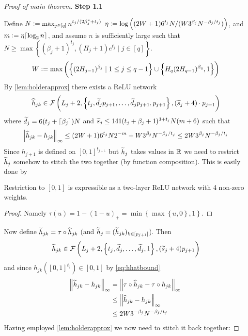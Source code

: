 \begin{proof}[Proof of main theorem]
  \textbf{Step 1.1}

  Define %
  $N \vcentcolon= \max_{j \in [q]} n^{t_j/(2 \beta^*_j + t_j)}$
  $\eta \vcentcolon= \log \left((2W + 1) 6^{t_j} N
  / (W 3^{\beta_j} N^{-\beta_j/t_j}) \right)$,
  and $m \vcentcolon= \eta \lceil\log_2 n\rceil$,
  and assume $n$ is sufficiently large such that
  $N \geq \max \left\{ (\beta_j + 1)^{t_j},
  (H_j+1)e^{t_j} \mid j \in [q] \right\}$.
  \begin{equation}
    W \vcentcolon= \max \left( \left\{ (2 H_{j-1})^{\beta_j} \mid 1\leq j\leq q-1 \right\}
    \cup \left\{ H_q(2H_{q-1})^{\beta_q}, 1\right\} \right)
  \end{equation}
  By \cref{lem:holderapprox} there exists a ReLU network
  \begin{equation}
    \widehat{h}_{jk} \in \mathcal{F} \left( L_j + 2, \left\{ t_j, \widetilde{d}_j p_{j+1}, \dots,
    \widetilde{d}_j p_{j+1}, p_{j+1} \right\}, (\widetilde{s}_j + 4) \cdot p_{j+1} \right)
  \end{equation}
  where $\widetilde{d}_j = 6(t_j + \lceil\beta_j\rceil)N$ and
  $\widetilde{s}_j \leq 141 (t_j + \beta_j + 1)^{3 + t_j} N (m + 6)$
  such that
  \begin{equation}
    \norm{\widehat{h}_{jk} - h_{jk}}_\infty \leq (2 W + 1) 6^{t_j} N 2^{-m}
    + W 3^{\beta_j} N^{-\beta_j/t_j} \leq 2 W 3^{\beta_j} N^{-\beta_j/t_j}
    \label{eq:hhatbound}
  \end{equation} 
  Since $h_{j+1}$ is defined on $[0, 1]^{t_{j+1}}$ but $\widetilde{h}_j$ takes values
  in $\mathbb{R}$ we need to restrict $\widetilde{h}_j$ somehow to stitch
  the two together (by function composition). This is easily done by
  \begin{lem}
    Restriction to $[0, 1]$ is expressible as a two-layer ReLU network
    with 4 non-zero weights.
  \end{lem}
  \begin{proof}
    Namely $\tau(u) = 1 - (1 - u)_+ = \min \left\{
    \max \left\{ u, 0 \right\}, 1 \right\}$. %
  \end{proof}
  Now define
  $\widetilde{h}_{jk} = \tau \circ \widehat{h}_{jk}$
  (and $\widetilde{h}_{j} = (\widetilde{h}_{jk})_{k \in [p_{j + 1}]}$).
  Then
  \begin{equation}
    \widetilde{h}_{jk} \in \mathcal{F}\left( L_j + 2, \left\{ t_j,
  \widetilde{d}_j, \dots, \widetilde{d}_j, 1 \right\}, (\widetilde{s}_j + 4) p_{j+1} \right)
  \end{equation}
  and since $h_{jk}([0, 1]^{t_j}) \in [0, 1]$ by \cref{eq:hhatbound}
  \begin{align}
    \norm{\widetilde{h}_{jk} - h_{jk}}_\infty
    = &\; \norm{\tau \circ \widehat{h}_{jk} - \tau \circ h_{jk}}_\infty
    \\ \leq &\; \norm{\widehat{h}_{jk} - h_{jk}}_\infty
    \\ \leq &\; 2 W 3^{-\beta_j} N^{-\beta_j/t_j}
  \end{align}
  Having employed \cref{lem:holderapprox} we now need to stitch it
  back together:


\end{proof}
